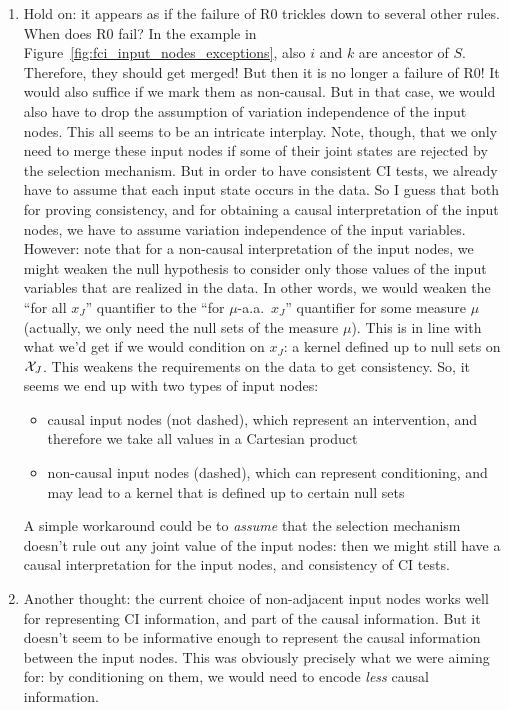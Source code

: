{\begin{enumerate}
  \item Hold on: it appears as if the failure of R0 trickles down to several other rules.
    When does R0 fail? In the example in Figure~\ref{fig:fci_input_nodes_exceptions}, also $i$ and $k$
    are ancestor of $S$. Therefore, they should get merged! But then it is no longer a failure of R0!
    It would also suffice if we mark them as non-causal. But in that case, we would also have to 
    drop the assumption of variation independence of the input nodes.
    This all seems to be an intricate interplay.
    Note, though, that we only need to merge these input nodes if some of their joint states are
    rejected by the selection mechanism. But in order to have consistent CI tests, we already have
    to assume that each input state occurs in the data.
    So I guess that both for proving consistency, and for obtaining a causal interpretation of the
    input nodes, we have to assume variation independence of the input variables.
    However: note that for a non-causal interpretation of the input nodes, we might weaken the
    null hypothesis to consider only those values of the input variables that are realized in the data.
    In other words, we would weaken the ``for all $x_J$'' quantifier to the ``for $\mu$-a.a.\ $x_J$''
    quantifier for some measure $\mu$ (actually, we only need the null sets of the measure $\mu$).
    This is in line with what we'd get if we would condition on $x_J$: a kernel defined up to null sets on $\mathcal{X}_J$.
    This weakens the requirements on the data to get consistency.
    So, it seems we end up with two types of input nodes:
    \begin{itemize}
      \item causal input nodes (not dashed), which represent an intervention, and therefore we 
        take all values in a Cartesian product
      \item non-causal input nodes (dashed), which can represent conditioning, and may lead to
        a kernel that is defined up to certain null sets
    \end{itemize}
    A simple workaround could be to \emph{assume} that the selection mechanism doesn't rule out
    any joint value of the input nodes: then we might still have a causal interpretation for the
    input nodes, and consistency of CI tests.

  \item Another thought: the current choice of non-adjacent input nodes works well for representing
    CI information, and part of the causal information. But it doesn't seem to be informative enough
    to represent the causal information between the input nodes. This was obviously precisely what
    we were aiming for: by conditioning on them, we would need to encode \emph{less} causal information.


\end{enumerate}}
